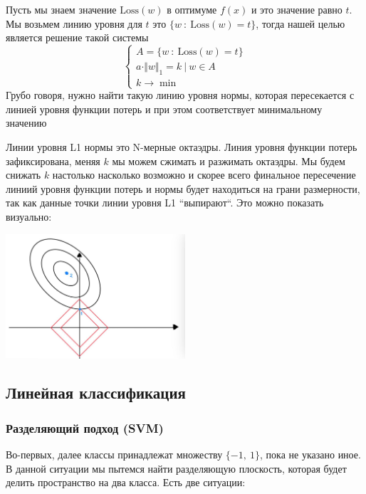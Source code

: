 \documentclass{article}
\begin{document}
    Пусть мы знаем значение $\text{Loss}(w)$ в оптимуме $f(x)$ и это значение равно $t$. 
    Мы возьмем линию уровня для $t$ это 
    $ \{w \ : \ \text{Loss}(w) = t \}$, тогда нашей целью является решение такой системы 
    \[
    \begin{cases}
        A = \{w \ : \ \text{Loss}(w) = t \} \\ 
        a \cdot \Vert w \Vert_{1} = k \ | \ w \in A \\
        k \rightarrow \min
    \end{cases}
    \]
    Грубо говоря, нужно найти такую линию уровня нормы, которая пересекается с линией уровня функции потерь 
    и при этом соответствует минимальному значению 

    Линии уровня L1 нормы это N-мерные октаэдры. Линия уровня функции потерь зафиксирована, меняя $k$
    мы можем сжимать и разжимать октаэдры. Мы будем снижать $k$ настолько насколько возможно и скорее всего 
    финальное пересечение линиий уровня функции потерь и нормы будет находиться на грани размерности, так как данные точки 
    линии уровня L1 ``выпирают``. Это можно показать визуально: 

    \begin{center}
        \includegraphics[trim=0cm 0cm 1.5cm 0cm, clip, width=0.5\textwidth]{photos/L1.jpg}
    \end{center}


    \subsection{Линейная классификация}


    \subsubsection{Разделяющий подход (SVM)}
    Во-первых, далее классы принадлежат множеству $\{-1, \ 1 \}$, пока не указано иное. В данной ситуации мы 
    пытемся найти разделяющую плоскость, которая будет делить пространство на два класса. 
    Есть две ситуации: 
    
\end{document}
